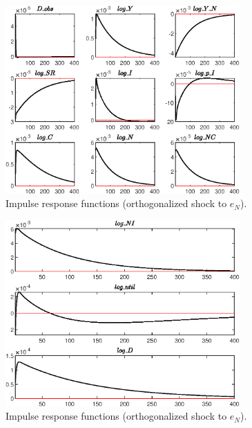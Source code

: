 \begin{figure}[H]
\centering 
\includegraphics[width=0.80\textwidth]{BRS_growth/graphs/BRS_growth_IRF_e_N2}
\caption{Impulse response functions (orthogonalized shock to ${e_N}$).}\label{Fig:IRF:e_N:2}
\end{figure}
 
\begin{figure}[H]
\centering 
\includegraphics[width=0.80\textwidth]{BRS_growth/graphs/BRS_growth_IRF_e_N3}
\caption{Impulse response functions (orthogonalized shock to ${e_N}$).}\label{Fig:IRF:e_N:3}
\end{figure}
 
